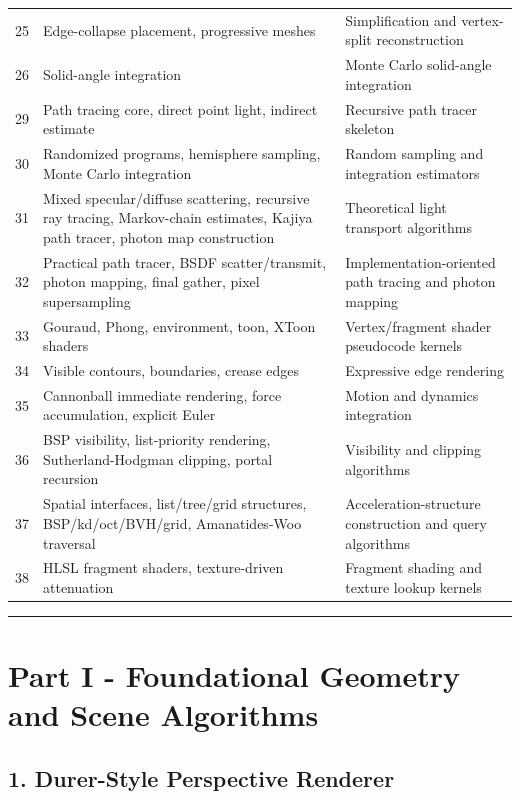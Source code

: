 \documentclass[10pt,letterpaper]{article}
\begin{document}
\begin{longtable}{L{0.20\textwidth}L{0.34\textwidth}L{0.38\textwidth}}
25 & Edge-collapse placement, progressive meshes & Simplification and vertex-split reconstruction \\
26 & Solid-angle integration & Monte Carlo solid-angle integration \\
29 & Path tracing core, direct point light, indirect estimate & Recursive path tracer skeleton \\
30 & Randomized programs, hemisphere sampling, Monte Carlo integration & Random sampling and integration estimators \\
31 & Mixed specular/diffuse scattering, recursive ray tracing, Markov-chain estimates, Kajiya path tracer, photon map construction & Theoretical light transport algorithms \\
32 & Practical path tracer, BSDF scatter/transmit, photon mapping, final gather, pixel supersampling & Implementation-oriented path tracing and photon mapping \\
33 & Gouraud, Phong, environment, toon, XToon shaders & Vertex/fragment shader pseudocode kernels \\
34 & Visible contours, boundaries, crease edges & Expressive edge rendering \\
35 & Cannonball immediate rendering, force accumulation, explicit Euler & Motion and dynamics integration \\
36 & BSP visibility, list-priority rendering, Sutherland-Hodgman clipping, portal recursion & Visibility and clipping algorithms \\
37 & Spatial interfaces, list/tree/grid structures, BSP/kd/oct/BVH/grid, Amanatides-Woo traversal & Acceleration-structure construction and query algorithms \\
38 & HLSL fragment shaders, texture-driven attenuation & Fragment shading and texture lookup kernels \\
\bottomrule
\end{longtable}

\medskip\hrule\medskip

\clearpage
\section{Part I - Foundational Geometry and Scene Algorithms}

\subsection{1. Durer-Style Perspective Renderer}
\end{document}
